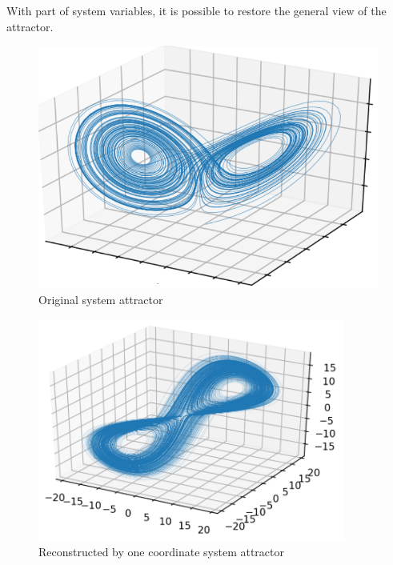 
With part of system variables, it is possible to restore the general view of the attractor.

\begin{minipage}{0.4\textwidth}
\begin{figure}[h]
    \centering
    \hspace{-10 mm}
    \includegraphics[width=1.2\textwidth]{images/attr_L.png}
    \caption{Original system attractor}
\end{figure}
\end{minipage}
\hfill
\begin{minipage}{0.55\textwidth}

\begin{figure}[h]
    \centering
    \includegraphics[width=0.9\textwidth]{images/rest.png}
    \caption{Reconstructed by one coordinate system attractor}
\end{figure}

\end{minipage}
